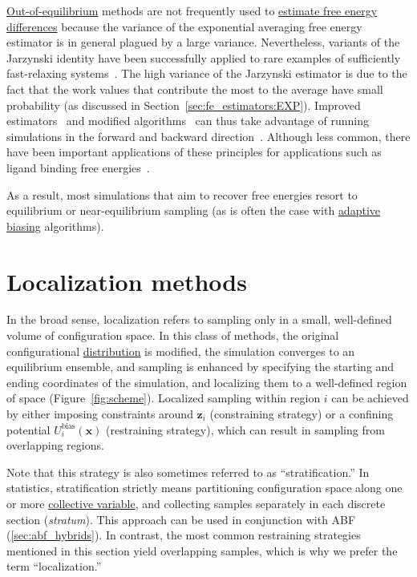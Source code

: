 \documentclass[9pt,review]{livecoms}
\newcommand{\vx}{\mathbf{x}}
\newcommand{\vz}{\mathbf{z}}
\begin{document}
\hyperlink{ref:OutOfEq} {Out-of-equilibrium} methods are not frequently used to \hyperlink{ref:FEestimator} {estimate free energy differences} because the variance of the exponential averaging free energy estimator is in general plagued by a large variance.
Nevertheless, variants of the Jarzynski identity have been successfully applied to rare examples of sufficiently fast-relaxing systems~\cite{park-khalili-araghi-tajkhorshid-schulten-03}.
The high variance of the Jarzynski estimator is due to the fact that the work values that contribute the most to the average have small probability (as discussed in Section~\ref{sec:fe_estimators:EXP}).
Improved estimators~\cite{minh-adlib-08} and modified algorithms~\cite{VJ08,hartmann-schuette-zhang-19,rousset2006equilibrium} can thus take advantage of running simulations in the forward and backward direction~\cite{hummer-07}. Although less common, there have been important applications of these principles for applications such as ligand binding free energies~\citep{alchemy_Gapsys_2020}.


As a result, most simulations that aim to recover free energies resort to equilibrium or near-equilibrium sampling (as is often the case with \hyperlink{ref:Adaptive} {adaptive} \hyperlink{ref:biasingE} {biasing} algorithms).


\section{Localization methods}
\label{sec:localization}

In the broad sense, localization refers to sampling only in a small, well-defined volume of configuration space. In this class of methods, the original configurational \hyperlink{ref:Distribution}{distribution} is modified, the simulation converges to an equilibrium ensemble, and sampling is enhanced by specifying the starting and ending coordinates of the simulation, and localizing them to a well-defined region of space (Figure~\ref{fig:scheme}). Localized sampling within region $i$ can be achieved by either imposing constraints around $\vz_i$ (constraining strategy) or a confining potential $U^{\mathrm{bias}}_i(\vx)$ (restraining strategy), which can result in sampling from overlapping regions.

Note that this strategy is also sometimes referred to as ``stratification.'' In statistics, stratification strictly means partitioning configuration space along one or more \hyperlink{ref:CV} {collective variable}, and collecting samples separately in each discrete section (\textit{stratum}). This approach can be used in conjunction with ABF (\ref{sec:abf_hybrids}).
In contrast, the most common restraining strategies mentioned in this section yield overlapping samples, which is why we prefer the term ``localization.''
\end{document}
